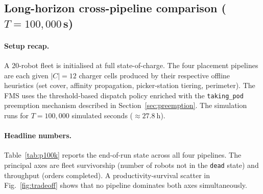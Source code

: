 \documentclass[conference]{IEEEtran}
\begin{document}
\subsection{Long-horizon cross-pipeline comparison ($T = 100{,}000$\,s)}
\label{sec:r100k}

\paragraph{Setup recap.} A 20-robot fleet is initialised at full state-of-charge. The four placement pipelines are each given $|C| = 12$ charger cells produced by their respective offline heuristics (set cover, affinity propagation, picker-station tiering, perimeter). The FMS uses the threshold-based dispatch policy enriched with the \texttt{taking\_pod} preemption mechanism described in Section~\ref{sec:preemption}. The simulation runs for $T = 100{,}000$ simulated seconds ($\approx\SI{27.8}{\hour}$).

\paragraph{Headline numbers.} Table~\ref{tab:p100k} reports the end-of-run state across all four pipelines. The principal axes are fleet survivorship (number of robots not in the \texttt{dead} state) and throughput (orders completed). A productivity-survival scatter in Fig.~\ref{fig:tradeoff} shows that no pipeline dominates both axes simultaneously.
\end{document}
